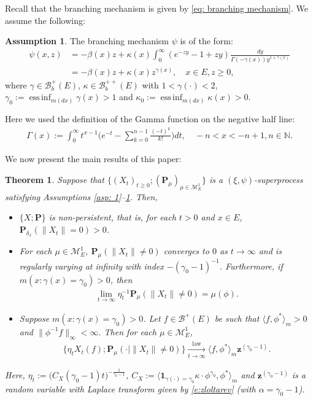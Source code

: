 \documentclass[12pt,a4paper]{amsart}
\newtheorem{thm}{Theorem}[section]
\theoremstyle{definition}
\newtheorem{asp}{Assumption}
\numberwithin{equation}{section}
\begin{document}
Recall that the branching mechanism is given by \eqref{eq: branching mechanism}. 
We assume the following:
\begin{asp} \label{asp: 4}
	The branching mechanism $\psi$ is of the form:
  \begin{align}
    \psi(x,z)
    &= - \beta(x) z + \kappa(x) \int_0^\infty (e^{-z y} - 1+ z y) \frac{dy}{\Gamma(- \gamma(x)) y^{1+ \gamma(x)}}
    \\&= -\beta (x) z + \kappa(x) z^{\gamma(x)},
    \quad x\in E, z \geq 0,
\end{align}
where $\gamma \in \mathscr B^+_b(E)$, $\kappa \in \mathscr B^{++}_b(E)$ with $1< \gamma(\cdot )<2$, $\gamma_0 := \operatorname{ess\,inf}_{m(dx)} \gamma(x)> 1$ and $\kappa_0:=\operatorname{ess\,inf}_{m(dx)}\kappa(x) > 0$.
\end{asp}
Here we used the definition of the Gamma function on the negative half line:
\begin{align}\label{eq: definition of Gamma function}
  \Gamma(x)
  := \int_0^\infty t^{x-1} \Big(e^{-t} - \sum_{k=0}^{n-1} \frac{(-t)^k}{k!}\Big) dt,
  \quad -n< x< -n+1, n\in \mathbb N.
\end{align}
	
We now present the main results of this paper:
\begin{thm}
\label{thm: main theorem}
  Suppose that $\{(X_t)_{t\geq 0}; (\mathbf P_\mu)_{\mu \in \mathcal M_E^1}\}$ is a $(\xi, \psi)$-superprocess satisfying Assumptions \ref{asp: 1}--\ref{asp: 4}.
  Then,
  \begin{itemize}
  \item[(1)]
    $\{X; \mathbf P\}$ is non-persistent, that is, for each $t > 0$ and $x\in E$,
    $\mathbf P_{\delta_x}( \| X_t\| = 0) > 0$.
  \item[(2)]
    For each $\mu \in \mathcal M^1_E$, $\mathbf P_{\mu}(\|X_t\| \neq 0)$ converges to $0$ as $t \to \infty$ and is regularly varying at infinity with index $-(\gamma_0-1)^{-1}$.
    Furthermore, if $m(x: \gamma (x)= \gamma_0)>0$, then
    \begin{align}
      \lim_{t\to\infty} \eta_t^{-1}\mathbf P_{\mu}(\|X_t\| \neq 0)
      =\mu(\phi).
    \end{align}
  \item[(3)]
    Suppose $m( x:\gamma(x)=\gamma_0 )>0$.
    Let $f \in \mathscr B^+(E)$ be such that $\langle f, \phi^* \rangle_m > 0$ and $\| \phi^{-1}f \|_\infty < \infty$. Then for each $\mu \in \mathcal M_E^1$,
    \begin{align}
      \{\eta_t X_t(f) ; \mathbf P_{\mu}(\cdot |\|X_t\| \neq 0) \}
      \xrightarrow[t\to \infty]{\operatorname{law}} \langle f, \phi^*\rangle_m \mathbf z^{(\gamma_0 - 1)}.
    \end{align}
  \end{itemize}
  Here, $\eta_t := \big( C_X(\gamma_0 - 1) t \big)^{- \frac {1} {\gamma_0 - 1} }$, $C_X := \langle \mathbf 1_{\gamma(\cdot) = \gamma_0} \kappa\cdot \phi^{\gamma_0}, \phi^* \rangle_m$ and $\mathbf z^{(\gamma_0 - 1)}$ is a random variable with Laplace transform given by \eqref{e:zloltarev}
  (with $\alpha=\gamma_0 -1$).
\end{thm}
\end{document}
